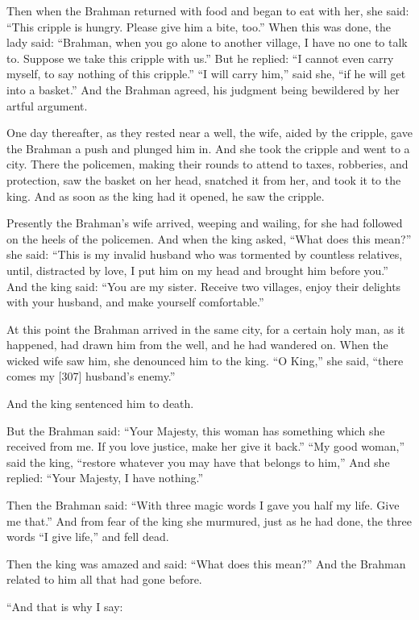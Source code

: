 \documentclass{article}
\begin{document}
Then when the Brahman returned with food and began to eat with her,
she said: ``This cripple is hungry. Please give him a bite, too.''
When this was done, the lady said:
``Brahman, when you go alone to another village, I have no one to talk to. Suppose we take this cripple with us.''
But he replied:
``I cannot even carry myself, to say nothing of this cripple.''
``I will carry him,'' said she, ``if he will get into a basket.''
And the Brahman agreed, his judgment being bewildered by her artful
argument.

One day thereafter, as they rested near a well, the wife, aided by
the cripple, gave the Brahman a push and plunged him in. And she
took the cripple and went to a city. There the policemen, making
their rounds to attend to taxes, robberies, and protection, saw the
basket on her head, snatched it from her, and took it to the king.
And as soon as the king had it opened, he saw the cripple.

Presently the Brahman's wife arrived, weeping and wailing, for she
had followed on the heels of the policemen. And when the king
asked, ``What does this mean?'' she said:
``This is my invalid husband who was tormented by countless relatives, until, distracted by love, I put him on my head and brought him before you.''
And the king said:
``You are my sister. Receive two villages, enjoy their delights with your husband, and make yourself comfortable.''

At this point the Brahman arrived in the same city, for a certain
holy man, as it happened, had drawn him from the well, and he had
wandered on. When the wicked wife saw him, she denounced him to the
king. ``O King,'' she said,
``there comes my [307] husband's enemy.''

And the king sentenced him to death.

But the Brahman said:
``Your Majesty, this woman has something which she received from me. If you love justice, make her give it back.''
``My good woman,'' said the king,
``restore whatever you may have that belongs to him,'' And she
replied: ``Your Majesty, I have nothing.''

Then the Brahman said:
``With three magic words I gave you half my life. Give me that.''
And from fear of the king she murmured, just as he had done, the
three words ``I give life,'' and fell dead.

Then the king was amazed and said: ``What does this mean?'' And the
Brahman related to him all that had gone before.

“And that is why I say:
\end{document}
